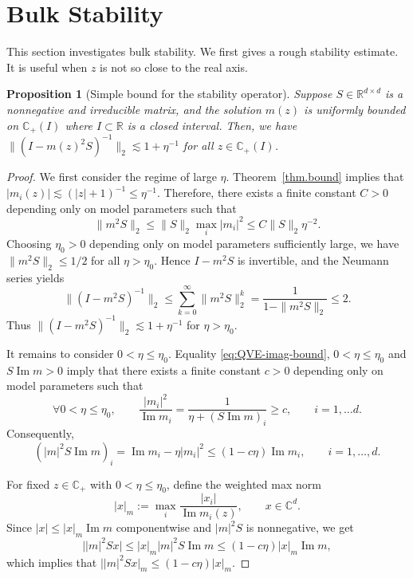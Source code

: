 \documentclass[11pt,twoside, a4paper]{article}
\numberwithin{equation}{section}
\numberwithin{figure}{section}
\theoremstyle{plain} %
\newtheorem{proposition}[theorem]{Proposition}
\theoremstyle{definition}
\theoremstyle{remark}
\newcommand{\1} {\mspace{1 mu}}
\newcommand{\2} {\mspace{2 mu}}
\newcommand{\R} {\mathbb{R}}
\newcommand{\C} {{\mathbb{C}}}
\newcommand{\Cp} {\mathbb {C}_+}
\DeclareMathOperator{\im}{Im}
\begin{document}
\section{Bulk Stability}
This section investigates bulk stability. We first gives a rough stability estimate. It is useful when $z$ is not so close to the real axis. 
\begin{proposition}[Simple bound for the stability operator]\label{pro.simple-bound-stability}
Suppose \(S\in\R^{d\times d}\) is a nonnegative and irreducible matrix, and the solution $m(z)$ is uniformly bounded on $\Cp(I)$ where $I\subset\R$ is a closed interval.
Then, we have $\|(I-m(z)^2S)^{-1}\|_2\lesssim 1+\eta^{-1}$ for all $z\in\C_+(I)$.
\end{proposition}


\begin{proof}
We first consider the regime of large \(\eta\). Theorem~\ref{thm.bound} implies that 
$
    |m_i(z)|\lesssim (|z|+1)^{-1}\le \eta^{-1}.
$
Therefore, there exists a finite constant $C>0$ depending only on model parameters such that
\[
    \|m^2S\|_2
    \le \|S\|_2\max_i |m_i|^2
    \le C\|S\|_2\eta^{-2}.
\]
Choosing \(\eta_0>0\) depending only on model parameters sufficiently large, we have
$
    \|m^2S\|_2\le 1/2
$ for all $\eta>\eta_0$.
Hence \(I-m^2S\) is invertible, and the Neumann series yields
\begin{equation}\label{eq.large-regime-inverse-bound}
    \|(I-m^2S)^{-1}\|_2
    \le
    \sum_{k=0}^\infty \|m^2S\|_2^k
    =
    \frac1{1-\|m^2S\|_2}
    \le 2.
\end{equation}
Thus
$
    \|(I-m^2S)^{-1}\|_2\lesssim 1+\eta^{-1}
$
for \(\eta>\eta_0\).

It remains to consider \(0<\eta\le\eta_0\). 
Equality \eqref{eq:QVE-imag-bound}, $0<\eta\le\eta_0$ and $S\im m>0$ imply that there exists a finite constant $c>0$ depending  only on model parameters such that
\begin{equation*}
  \forall 0<\eta\le\eta_0,\qquad\frac{|m_i|^2}{\im m_i}=\frac{1}{\eta+(S\im m)_i}\ge c,\qquad i=1,\dots d.
\end{equation*}
Consequently,
\[
   (|m|^2S\im m)_i
    =
    \im m_i-\eta |m_i|^2
    \le
    (1-c\eta)\im m_i,\qquad i=1,\dots,d.
\]

For fixed \(z\in\mathbb C_+\) with \(0<\eta\le\eta_0\), define the weighted max norm
\[
    |x|_{m}:=\max_i \frac{|x_i|}{\im m_i(z)},\qquad x\in\mathbb C^d.
\]
Since \(|x|\le |x|_m \im m\) componentwise and
\(|m|^2S\) is nonnegative, we get
\[
    \big||m|^2Sx\big|
    \le
    |x|_m |m|^2S\im m
    \le
    (1-c\eta)|x|_m \im m,
\]
which implies that
$
    \bigl||m|^2Sx\bigr|_m
    \le
    (1-c\eta)|x|_m .
$


\end{proof}
\end{document}
